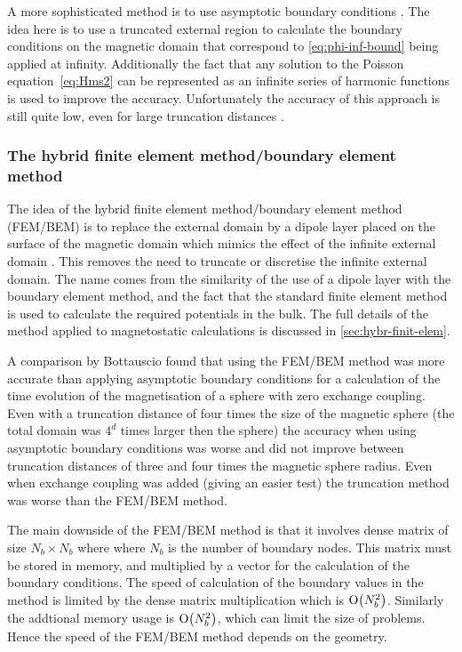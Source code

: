 A more sophisticated method is to use asymptotic boundary conditions \cite{Yang1997}. The idea here is to use a truncated external region to calculate the boundary conditions on the magnetic domain that correspond to \cref{eq:phi-inf-bound} being applied at infinity.
Additionally the fact that any solution to the Poisson equation~\cref{eq:Hms2} can be represented as an infinite series of harmonic functions is used to improve the accuracy.
Unfortunately the accuracy of this approach is still quite low, even for large truncation distances \cite{Bottauscio2008}.


\subsubsection{The hybrid finite element method/boundary element method}
\label{sec:bound-elem-meth}

The idea of the hybrid finite element method/boundary element method (FEM/BEM) is to replace the external domain by a dipole layer placed on the surface of the magnetic domain which mimics the effect of the infinite external domain \cite{Fredkin1990}.
This removes the need to truncate or discretise the infinite external domain.
The name comes from the similarity of the use of a dipole layer with the boundary element method, and the fact that the standard finite element method is used to calculate the required potentials in the bulk.
The full details of the method applied to magnetostatic calculations is discussed in \cref{sec:hybr-finit-elem}.

A comparison by Bottauscio\cite{Bottauscio2008} found that using the FEM/BEM method was more accurate than applying asymptotic boundary conditions for a calculation of the time evolution of the magnetisation of a sphere with zero exchange coupling.
Even with a truncation distance of four times the size of the magnetic sphere (the total domain was $4^d$ times larger then the sphere) the accuracy when using asymptotic boundary conditions was worse and did not improve between truncation distances of three and four times the magnetic sphere radius.
Even when exchange coupling was added (giving an easier test) the truncation method was worse than the FEM/BEM method.

The main downside of the FEM/BEM method is that it involves dense matrix of size $N_b \times N_b$ where where $N_b$ is the number of boundary nodes.
This matrix must be stored in memory, and multiplied by a vector for the calculation of the boundary conditions.
The speed of calculation of the boundary values in the method is limited by the dense matrix multiplication which is $\text{O}{\left( N_b^2 \right)}$.
Similarly the addtional memory usage is $\text{O}{\left( N_b^2 \right)}$, which can limit the size of problems.
Hence the speed of the FEM/BEM method depends on the geometry.

